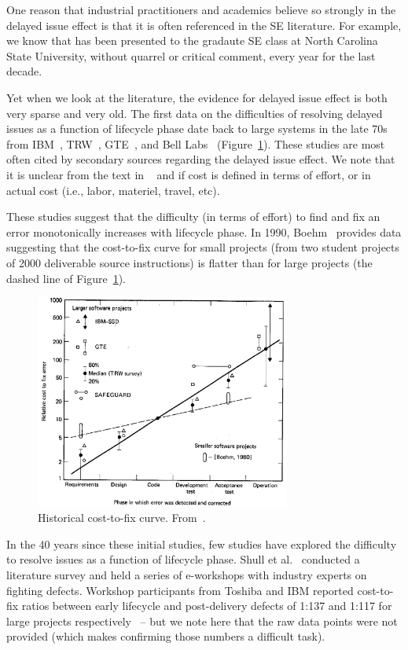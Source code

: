 One reason that industrial practitioners and academics believe so strongly in the delayed issue effect is that it is often referenced
in the SE literature. For example,
we know that  has been presented to the gradaute SE class at North Carolina State University, without quarrel or critical comment, every year for the last decade.

Yet when we look at the literature, the evidence for
delayed issue effect is both very sparse and very old.
The first data on the difficulties of resolving delayed issues as a function of lifecycle phase date back to large systems in the late 70s from IBM~\cite{Fagan76}, TRW~\cite{Boehm76}, GTE~\cite{Daly77}, and Bell Labs~\cite{Stephenson76} (Figure~\ref{fig:cost-to-fix}). These studies are most often cited by secondary sources regarding the delayed issue effect. We note that it is unclear from the text in ~\cite{Daly77} and \cite{Boehm76} if cost is defined in terms of effort, or in actual cost (i.e., labor, materiel, travel, etc).

These studies suggest that the difficulty (in terms of effort) to find and fix an error monotonically increases with lifecycle phase.  In 1990, Boehm~\cite{Boehm80} provides data suggesting that the cost-to-fix curve for small projects (from two student projects of 2000 deliverable source instructions) is flatter than for large projects (the dashed line of Figure~\ref{fig:cost-to-fix}).

\begin{figure}[!b]
 \includegraphics[width=3.3in]{img/boehm_cost-to-fix.png}
 \caption{Historical cost-to-fix curve. From~\cite{Boehm81}.}\label{fig:cost-to-fix}
 \end{figure}
 
In the 40 years since these initial studies, few studies have explored the difficulty to resolve issues
as a function of lifecycle phase. 
Shull et al.~\cite{Shull02} conducted a literature survey and held a series of e-workshops with industry experts on fighting defects. Workshop participants from Toshiba and IBM reported cost-to-fix ratios between early lifecycle and post-delivery defects of 1:137 and 1:117 for large projects respectively~\cite{Shull02} -- but we note here that the raw data points were not provided (which makes confirming those numbers 
a difficult task). 


